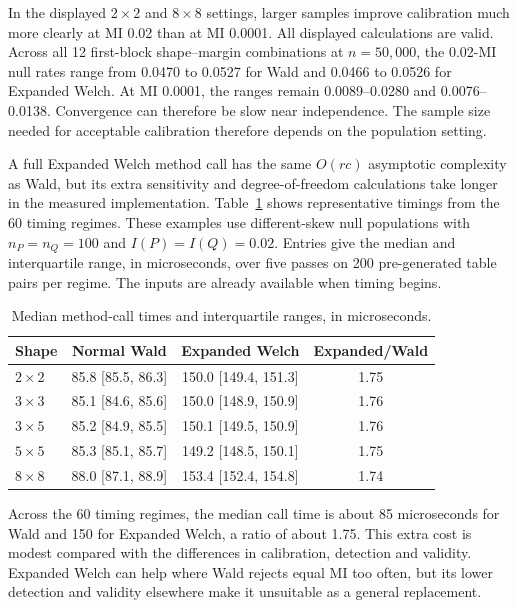 In the displayed \(2\times2\) and \(8\times8\) settings, larger samples
improve calibration much more clearly at MI 0.02 than at MI 0.0001.
All displayed calculations are valid. Across all 12
first-block shape--margin combinations at \(n=50{,}000\), the 0.02-MI
null rates range from 0.0470 to 0.0527 for Wald and 0.0466 to 0.0526 for
Expanded Welch. At MI 0.0001, the ranges remain 0.0089--0.0280 and
0.0076--0.0138. Convergence can therefore be slow near independence.
The sample size needed for acceptable calibration therefore depends on the
population setting.

\FloatBarrier

A full Expanded Welch method call
has the same \(O(rc)\) asymptotic complexity as Wald, but its extra
sensitivity and degree-of-freedom calculations take longer in the
measured implementation. Table~\ref{tab:runtime-by-shape} shows
representative timings from the 60 timing regimes.
These examples use different-skew null populations with
\(n_P=n_Q=100\) and \(I(P)=I(Q)=0.02\). Entries give the median and
interquartile range, in microseconds, over five passes on 200 pre-generated table pairs
per regime. The inputs are already available when timing begins.

\begin{table}[htbp]
\centering
\small
\caption{Median method-call times and interquartile ranges, in microseconds.}
\label{tab:runtime-by-shape}
\begin{tabular}{@{}lccc@{}}
\toprule
Shape & Normal Wald & Expanded Welch & Expanded/Wald\\
\midrule
\(2\times2\) & 85.8 [85.5, 86.3] & 150.0 [149.4, 151.3] & 1.75\\
\(3\times3\) & 85.1 [84.6, 85.6] & 150.0 [148.9, 150.9] & 1.76\\
\(3\times5\) & 85.2 [84.9, 85.5] & 150.1 [149.5, 150.9] & 1.76\\
\(5\times5\) & 85.3 [85.1, 85.7] & 149.2 [148.5, 150.1] & 1.75\\
\(8\times8\) & 88.0 [87.1, 88.9] & 153.4 [152.4, 154.8] & 1.74\\
\bottomrule
\end{tabular}
\end{table}

\FloatBarrier

Across the 60 timing regimes, the median call time is about
85 microseconds for Wald and 150 for Expanded Welch, a ratio of
about 1.75.
This extra cost is modest compared with the differences in calibration,
detection and validity. Expanded Welch can help where Wald rejects equal MI
too often, but its lower detection and validity elsewhere make it unsuitable
as a general replacement.
